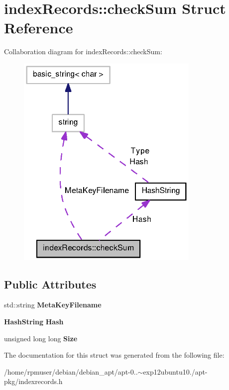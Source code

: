 \section{index\-Records\-:\-:check\-Sum \-Struct \-Reference}
\label{structindexRecords_1_1checkSum}


\-Collaboration diagram for index\-Records\-:\-:check\-Sum\-:
\nopagebreak
\begin{figure}[H]
\begin{center}
\leavevmode
\includegraphics[width=248pt]{structindexRecords_1_1checkSum__coll__graph}
\end{center}
\end{figure}
\subsection*{\-Public \-Attributes}
\begin{DoxyCompactItemize}
\item 
std\-::string {\bfseries \-Meta\-Key\-Filename}\label{structindexRecords_1_1checkSum_aaf04a75ffa5003fc7cb7ebaf1981e9f3}

\item 
{\bf \-Hash\-String} {\bfseries \-Hash}\label{structindexRecords_1_1checkSum_af563e1a5581fdd126be0406568fda04b}

\item 
unsigned long long {\bfseries \-Size}\label{structindexRecords_1_1checkSum_a254f9ca5c1e1232788dedebd142044aa}

\end{DoxyCompactItemize}


\-The documentation for this struct was generated from the following file\-:\begin{DoxyCompactItemize}
\item 
/home/rpmuser/debian/debian\-\_\-apt/apt-\/0..$\sim$exp12ubuntu10./apt-\/pkg/indexrecords.\-h\end{DoxyCompactItemize}
